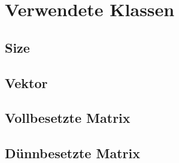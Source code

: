 \documentclass[12pt,a4paper]{scrartcl}
\numberwithin{equation}{section}
\numberwithin{myalgctr}{section}
\numberwithin{mytheoremctr}{subsection}
\numberwithin{mykorollarctr}{subsection}
\numberwithin{mylemmactr}{subsection}
\numberwithin{mybeispielctr}{subsection}
\begin{document}
	\newpage
	\appendix
	\section{Verwendete Klassen}
	\subsection{Size}
	
	\subsection{Vektor}
	
	\subsection{Vollbesetzte Matrix}
	
	\subsection{D\"unnbesetzte Matrix}
	
	
	\newpage
	\printbibliography
	\lstlistoflistings
	\listoffigures
	\thispagestyle{firststyle}
	
\end{document}

